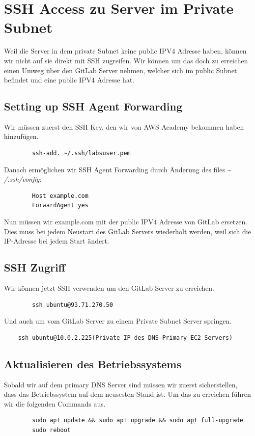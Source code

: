\documentclass[a4paper,12pt]{article}
\begin{document}
\section{SSH Access zu Server im Private Subnet}
Weil die Server in dem private Subnet keine public IPV4 Adresse haben, können wir nicht auf sie direkt mit SSH zugreifen. 
Wir können um das doch zu erreichen einen Umweg über den GitLab Server nehmen, welcher sich im public Subnet befindet und eine public IPV4 Adresse hat.

\subsection{Setting up SSH Agent Forwarding}
Wir müssen zuerst den SSH Key, den wir von AWS Academy bekommen haben hinzufügen.
\begin{verbatim}
		ssh-add. ~/.ssh/labsuser.pem
\end{verbatim}

Danach ermöglichen wir SSH Agent Forwarding durch Änderung des files \~{} \textit{/.ssh/config}:
\begin{verbatim}
		Host example.com 
		ForwardAgent yes
\end{verbatim}
Nun müssen wir example.com mit der public IPV4 Adresse von GitLab ersetzen. 
Dies muss bei jedem Neustart des GitLab Servers wiederholt werden, weil sich die IP-Adresse bei jedem Start ändert.


\subsection{SSH Zugriff}
Wir können jetzt SSH verwenden um den GitLab Server zu erreichen.
\begin{verbatim}
		ssh ubuntu@93.71.270.50
\end{verbatim}

Und auch um vom GitLab Server zu einem Private Subnet Server springen.
\begin{verbatim}
	ssh ubuntu@10.0.2.225(Private IP des DNS-Primary EC2 Servers)
\end{verbatim}


\subsection{Aktualisieren des Betriebssystems}

Sobald wir auf dem primary DNS Server sind müssen wir zuerst sicherstellen, dass das Betriebssystem auf dem neusesten Stand ist.
Um das zu erreichen führen wir die folgenden Commands aus.
\begin{verbatim}
		sudo apt update && sudo apt upgrade && sudo apt full-upgrade
		sudo reboot
\end{verbatim}
\end{document}
